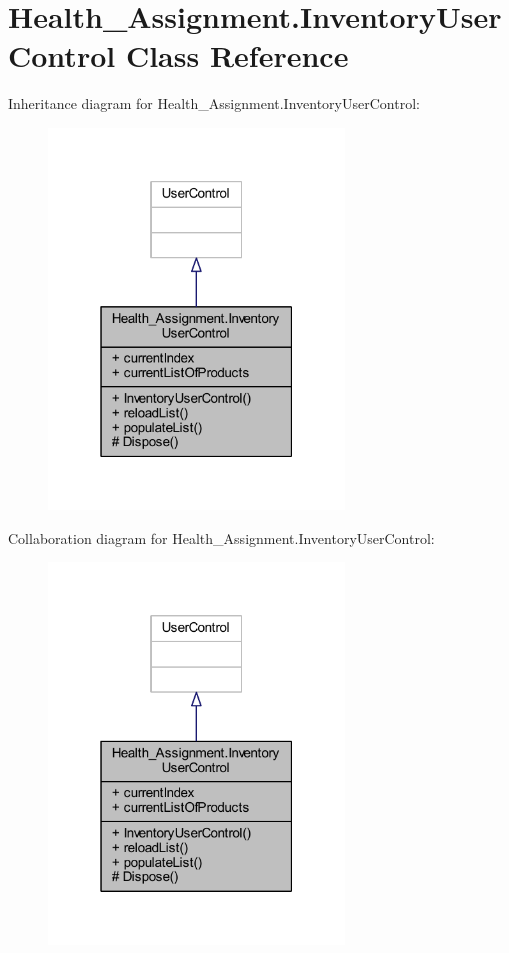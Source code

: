 \hypertarget{class_health___assignment_1_1_inventory_user_control}{}\section{Health\+\_\+\+Assignment.\+Inventory\+User\+Control Class Reference}
\label{class_health___assignment_1_1_inventory_user_control}


Inheritance diagram for Health\+\_\+\+Assignment.\+Inventory\+User\+Control\+:\nopagebreak
\begin{figure}[H]
\begin{center}
\leavevmode
\includegraphics[width=223pt]{class_health___assignment_1_1_inventory_user_control__inherit__graph}
\end{center}
\end{figure}


Collaboration diagram for Health\+\_\+\+Assignment.\+Inventory\+User\+Control\+:\nopagebreak
\begin{figure}[H]
\begin{center}
\leavevmode
\includegraphics[width=223pt]{class_health___assignment_1_1_inventory_user_control__coll__graph}
\end{center}
\end{figure}
